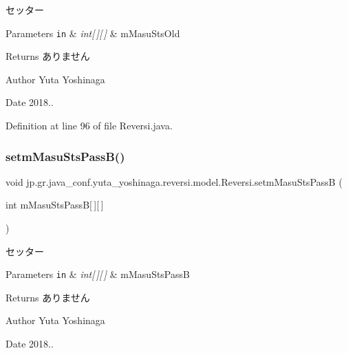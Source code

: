 セッター 


\begin{DoxyParams}[1]{Parameters}
\mbox{\tt in}  & {\em int\mbox{[}$\,$\mbox{]}\mbox{[}$\,$\mbox{]}} & m\+Masu\+Sts\+Old \\
\hline
\end{DoxyParams}
\begin{DoxyReturn}{Returns}
ありません 
\end{DoxyReturn}
\begin{DoxyAuthor}{Author}
Yuta Yoshinaga 
\end{DoxyAuthor}
\begin{DoxyDate}{Date}
2018.. 
\end{DoxyDate}


Definition at line 96 of file Reversi.\+java.

\mbox{\label{classjp_1_1gr_1_1java__conf_1_1yuta__yoshinaga_1_1reversi_1_1model_1_1_reversi_abe3cffd1d54da13f683504336828a4eb}} 
\subsubsection{\texorpdfstring{setm\+Masu\+Sts\+Pass\+B()}{setmMasuStsPassB()}}
{\footnotesize\ttfamily void jp.\+gr.\+java\+\_\+conf.\+yuta\+\_\+yoshinaga.\+reversi.\+model.\+Reversi.\+setm\+Masu\+Sts\+PassB (\begin{DoxyParamCaption}\item[{int}]{m\+Masu\+Sts\+PassB\mbox{[}$\,$\mbox{]}\mbox{[}$\,$\mbox{]} }\end{DoxyParamCaption})}



セッター 


\begin{DoxyParams}[1]{Parameters}
\mbox{\tt in}  & {\em int\mbox{[}$\,$\mbox{]}\mbox{[}$\,$\mbox{]}} & m\+Masu\+Sts\+PassB \\
\hline
\end{DoxyParams}
\begin{DoxyReturn}{Returns}
ありません 
\end{DoxyReturn}
\begin{DoxyAuthor}{Author}
Yuta Yoshinaga 
\end{DoxyAuthor}
\begin{DoxyDate}{Date}
2018.. 
\end{DoxyDate}


